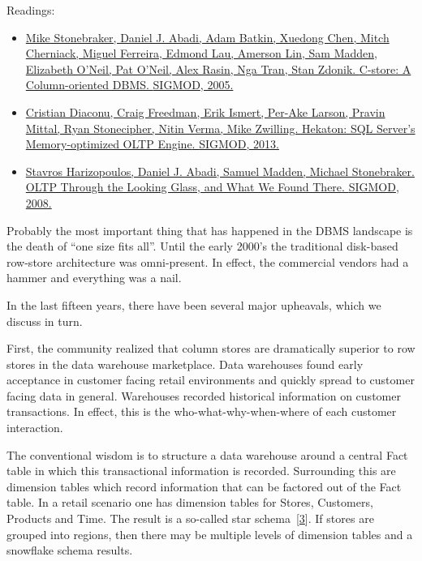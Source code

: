 \documentclass[b5paper,11pt,twoside,openright]{book}
\begin{document}
\begin{framed}
Readings:
\begin{itemize}
\item
\href{https://scholar.google.com/scholar?cluster=12924804892742402591}{Mike
  Stonebraker, Daniel J. Abadi, Adam Batkin, Xuedong Chen, Mitch
  Cherniack, Miguel Ferreira, Edmond Lau, Amerson Lin, Sam Madden,
  Elizabeth O'Neil, Pat O'Neil, Alex Rasin, Nga Tran, Stan Zdonik.
  {C-store: A Column-oriented DBMS}. {SIGMOD}, 2005.}
\item
\href{https://scholar.google.com/scholar?cluster=14161764654889427045}{Cristian
  Diaconu, Craig Freedman, Erik Ismert, Per-Ake Larson, Pravin Mittal,
  Ryan Stonecipher, Nitin Verma, Mike Zwilling. {Hekaton: SQL Server's
    Memory-optimized OLTP Engine}. {SIGMOD}, 2013.}
\item
\href{https://scholar.google.com/scholar?cluster=12931776946707721868}{Stavros
  Harizopoulos, Daniel J. Abadi, Samuel Madden, Michael Stonebraker. {OLTP
    Through the Looking Glass, and What We Found There}. {SIGMOD}, 2008.}
\end{itemize}
\end{framed}

Probably the most important thing that has happened in the DBMS
landscape is the death of ``one size fits all''. Until the early 2000's
the traditional disk-based row-store architecture was omni-present. In
effect, the commercial vendors had a hammer and everything was a nail.

In the last fifteen years, there have been several major upheavals,
which we discuss in turn.

First, the community realized that column stores are dramatically
superior to row stores in the data warehouse marketplace. Data
warehouses found early acceptance in customer facing retail environments
and quickly spread to customer facing data in general. Warehouses
recorded historical information on customer transactions. In effect,
this is the who-what-why-when-where of each customer interaction.

The conventional wisdom is to structure a data warehouse around a
central Fact table in which this transactional information is recorded.
Surrounding this are dimension tables which record information that can
be factored out of the Fact table. In a retail scenario one has
dimension tables for Stores, Customers, Products and Time. The result is
a so-called star schema~{{[}\protect\hyperlink{ref-kimball-book}{3}{]}}.
If stores are grouped into regions, then there may be multiple levels of
dimension tables and a snowflake schema results.
\end{document}
